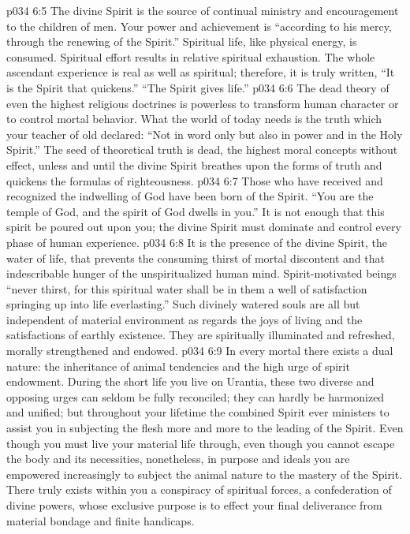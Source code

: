 \pc \vs p034 6:5 The divine Spirit is the source of continual ministry and encouragement to the children of men. Your power and achievement is “according to his mercy, through the renewing of the Spirit.” Spiritual life, like physical energy, is consumed. Spiritual effort results in relative spiritual exhaustion. The whole ascendant experience is real as well as spiritual; therefore, it is truly written, “It is the Spirit that quickens.” “The Spirit gives life.”\plusone
\vs p034 6:6 The dead theory of even the highest religious doctrines is powerless to transform human character or to control mortal behavior. What the world of today needs is the truth which your teacher of old declared: “Not in word only but also in power and in the Holy Spirit.” The seed of theoretical truth is dead, the highest moral concepts without effect, unless and until the divine Spirit breathes upon the forms of truth and quickens the formulas of righteousness.
\vs p034 6:7 Those who have received and recognized the indwelling of God have been born of the Spirit. “You are the temple of God, and the spirit of God dwells in you.” It is not enough that this spirit be poured out upon you; the divine Spirit must dominate and control every phase of human experience.\plusone
\vs p034 6:8 It is the presence of the divine Spirit, the water of life, that prevents the consuming thirst of mortal discontent and that indescribable hunger of the unspiritualized human mind. Spirit\hyp{}motivated beings “never thirst, for this spiritual water shall be in them a well of satisfaction springing up into life everlasting.” Such divinely watered souls are all but independent of material environment as regards the joys of living and the satisfactions of earthly existence. They are spiritually illuminated and refreshed, morally strengthened and endowed.
\pc \vs p034 6:9 In every mortal there exists a dual nature: the inheritance of animal tendencies and the high urge of spirit endowment. During the short life you live on Urantia, these two diverse and opposing urges can seldom be fully reconciled; they can hardly be harmonized and unified; but throughout your lifetime the combined Spirit ever ministers to assist you in subjecting the flesh more and more to the leading of the Spirit. Even though you must live your material life through, even though you cannot escape the body and its necessities, nonetheless, in purpose and ideals you are empowered increasingly to subject the animal nature to the mastery of the Spirit. There truly exists within you a conspiracy of spiritual forces, a confederation of divine powers, whose exclusive purpose is to effect your final deliverance from material bondage and finite handicaps.\plusone
